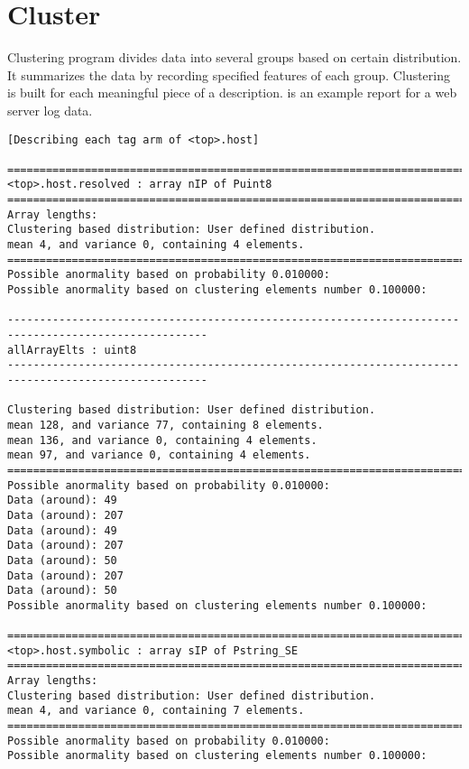 \chapter{Cluster}
\label{chap:cluster}

Clustering program divides data into several groups based on
certain distribution. It summarizes the data by recording specified
features of each group. Clustering is built for each meaningful 
piece of a \pads{} description. 
is an example report for a web server log data.     
%
\begin{figure*}
\begin{small}
\begin{verbatim}
[Describing each tag arm of <top>.host]

=====================================================================================================
<top>.host.resolved : array nIP of Puint8
=====================================================================================================
Array lengths: 
Clustering based distribution: User defined distribution. 
mean 4, and variance 0, containing 4 elements. 
=====================================================================================================
Possible anormality based on probability 0.010000: 
Possible anormality based on clustering elements number 0.100000: 

-----------------------------------------------------------------------------------------------------
allArrayElts : uint8
-----------------------------------------------------------------------------------------------------

Clustering based distribution: User defined distribution. 
mean 128, and variance 77, containing 8 elements. 
mean 136, and variance 0, containing 4 elements. 
mean 97, and variance 0, containing 4 elements. 
=====================================================================================================
Possible anormality based on probability 0.010000: 
Data (around): 49 
Data (around): 207 
Data (around): 49 
Data (around): 207 
Data (around): 50 
Data (around): 207 
Data (around): 50 
Possible anormality based on clustering elements number 0.100000: 

=====================================================================================================
<top>.host.symbolic : array sIP of Pstring_SE
=====================================================================================================
Array lengths: 
Clustering based distribution: User defined distribution. 
mean 4, and variance 0, containing 7 elements. 
=====================================================================================================
Possible anormality based on probability 0.010000: 
Possible anormality based on clustering elements number 0.100000: 


\end{verbatim}
\end{small}
\end{figure*}
